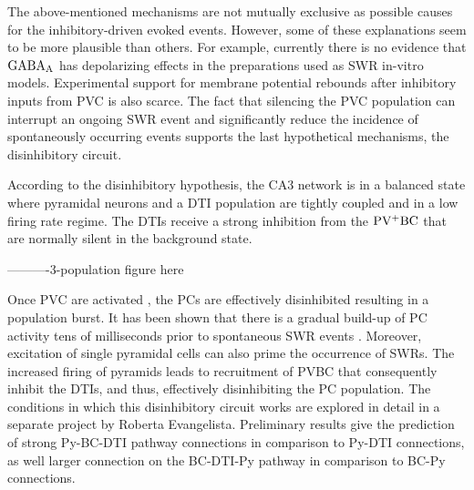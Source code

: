     The above-mentioned mechanisms are not mutually exclusive as possible
    causes for the inhibitory-driven evoked events. However, some of these
    explanations seem to be more plausible than others. For example, currently
    there is no evidence that $\rm GABA_A$ has depolarizing effects in the
    preparations used as SWR in-vitro models. Experimental support for membrane
    potential rebounds after inhibitory inputs from PVC is also scarce. The
    fact that silencing the PVC population can interrupt an ongoing SWR event and
    significantly reduce the incidence of spontaneously occurring events
    \citep{Schlingloff2014} supports the last hypothetical mechanisms, the
    disinhibitory circuit.

    According to the disinhibitory hypothesis, the CA3 network is in a balanced state where
    pyramidal neurons and a DTI population are tightly coupled  and in a low
    firing rate regime. The DTIs receive a strong inhibition from the
    $\rm PV^+BC$ that are normally silent in the background state. 
    
    ----------3-population figure here

    Once PVC are activated \citep{Ellender2010, Schlingloff2014}, the PCs are
    effectively disinhibited resulting in a population burst. It has been
    shown that there is a gradual build-up of PC activity tens of milliseconds
    prior to spontaneous SWR events \citep{delaPrida , Ellender2010,
    Schlingloff2014, Hulse2016}. Moreover, excitation of single pyramidal
    cells \citep{Baszelot2016} can also prime the occurrence of SWRs. The
    increased firing of pyramids leads to recruitment of PVBC that consequently
    inhibit the DTIs, and thus, effectively disinhibiting the PC population.
    The conditions in which this disinhibitory circuit works are explored in
    detail in a separate project by Roberta Evangelista. Preliminary results
    give the prediction of strong Py-BC-DTI pathway connections in comparison
    to Py-DTI connections, as well larger connection on the BC-DTI-Py pathway
    in comparison to BC-Py connections.

